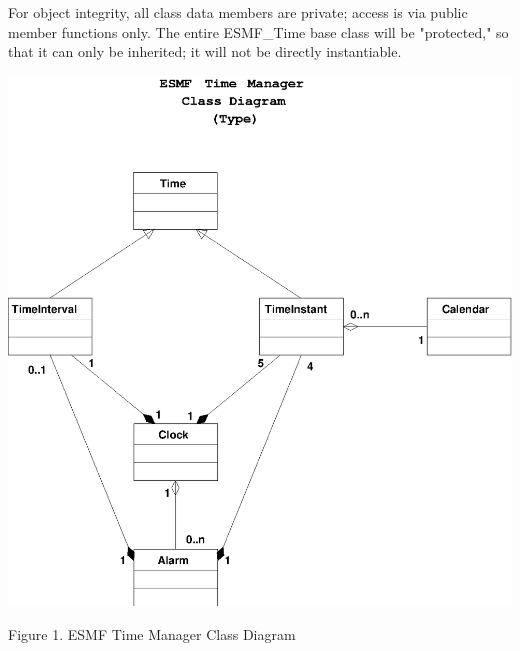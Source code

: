 For object integrity, all class data members are private; access is via
public member functions only. The entire ESMF\_Time base class will be
"protected," so that it can only be inherited; it will not be directly
instantiable.

\begin{center}
\includegraphics{TimeMgrClass.EPS}
   
Figure 1.  ESMF Time Manager Class Diagram
   
\end{center}
